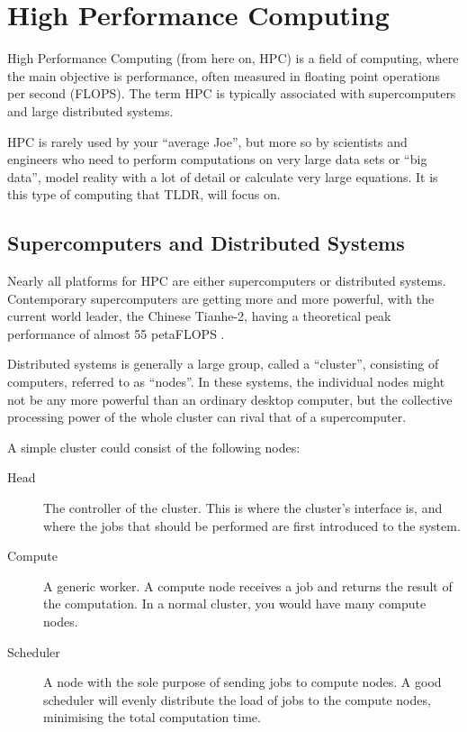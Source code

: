 \section{High Performance Computing}

High Performance Computing (from here on, HPC) is a field of computing, where the main objective is performance, often measured in floating point operations per second (FLOPS). The term HPC is typically associated with supercomputers and large distributed systems. 

HPC is rarely used by your \enquote{average Joe}, but more so by scientists and engineers who need to perform computations on very large data sets or \enquote{big data}, model reality with a lot of detail or calculate very large equations. It is this type of computing that TLDR, will focus on.


\subsection{Supercomputers and Distributed Systems}

Nearly all platforms for HPC are either supercomputers or distributed systems. Contemporary supercomputers are getting more and more powerful, with the current world leader, the Chinese Tianhe-2, having a theoretical peak performance of almost 55 petaFLOPS \cite{top500}.

Distributed systems is generally a large group, called a \enquote{cluster}, consisting of computers, referred to as \enquote{nodes}. In these systems, the individual nodes might not be any more powerful than an ordinary desktop computer, but the collective processing power of the whole cluster can rival that of a supercomputer.

A simple cluster could consist of the following nodes:
\begin{description}
	\item [Head]
	The controller of the cluster. This is where the cluster's interface is, and where the jobs that should be performed are first introduced to the system.
	\item [Compute]
	A generic worker. A compute node receives a job and returns the result of the computation. In a normal cluster, you would have many compute nodes.
	\item [Scheduler]
	A node with the sole purpose of sending jobs to compute nodes. A good scheduler will evenly distribute the load of jobs to the compute nodes, minimising the total computation time.
\end{description}


